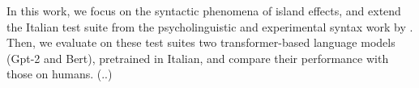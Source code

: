 In this work, we focus on the syntactic phenomena of island effects, and extend the Italian test suite from the psycholinguistic and experimental syntax work by \citet{sprouse2016experimental}. Then,  we evaluate on these test suites two transformer-based language models (Gpt-2 and Bert), pretrained in Italian, and compare their performance with those on humans. (..)%
